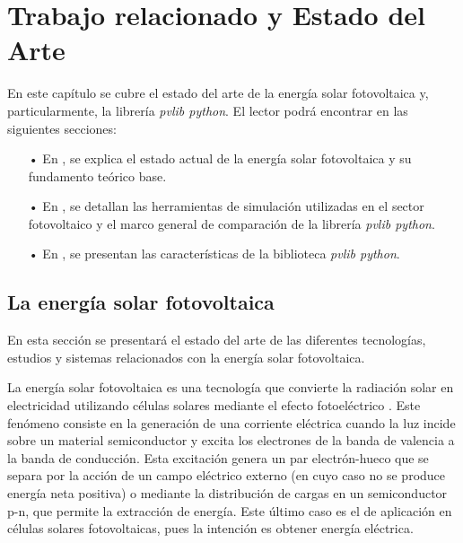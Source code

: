 \chapter{Trabajo relacionado y Estado del Arte} \label{chp:state-of-the-art}

En este capítulo se cubre el estado del arte de la energía solar fotovoltaica y, particularmente, la librería \textit{pvlib python}. El lector podrá encontrar en las siguientes secciones:

\begin{itemize}

      \item[•] En , se explica el estado actual de la energía solar fotovoltaica y su fundamento teórico base.

      \item[•] En , se detallan las herramientas de simulación utilizadas en el sector fotovoltaico y el marco general de comparación de la librería \textit{pvlib python}.

      \item[•] En , se presentan las características de la biblioteca \textit{pvlib python}.

\end{itemize}


\section{La energía solar fotovoltaica} \label{sct:energia-solar}

En esta sección se presentará el estado del arte de las diferentes tecnologías, estudios y sistemas relacionados con la energía solar fotovoltaica.

La energía solar fotovoltaica es una tecnología que convierte la radiación solar en electricidad utilizando células solares mediante el efecto fotoeléctrico \cite[][pp. 701-706]{böer2002survey}.
Este fenómeno consiste en la generación de una corriente eléctrica cuando la luz incide sobre un material semiconductor y excita los electrones de la banda de valencia a la banda de conducción. Esta excitación genera un par electrón-hueco que se separa por la acción de un campo eléctrico externo (en cuyo caso no se produce energía neta positiva) o mediante la distribución de cargas en un semiconductor p-n, que permite la extracción de energía. Este último caso es el de aplicación en células solares fotovoltaicas, pues la intención es obtener energía eléctrica.

